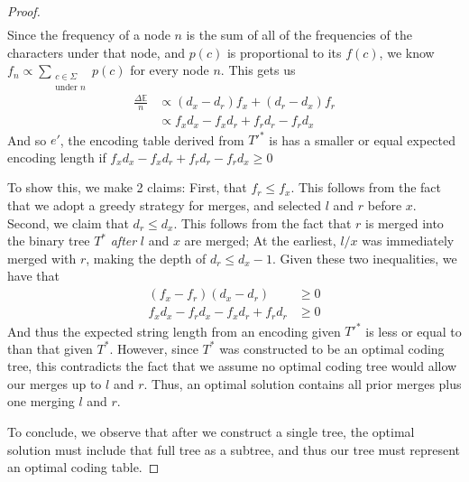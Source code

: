 \documentclass[10pt, twocolumn]{article}
\theoremstyle{prob}
\theoremstyle{definition}
\begin{document}
\begin{proof}
\begin{align*}
    \end{align*}
    Since the frequency of a node $n$ is the sum of all of the frequencies of the characters under that node, and $p(c)$ is proportional to its $f(c)$, we know $f_n \propto \sum_{\substack{c \in \Sigma \\ \text{under } n}} p(c) $ for every node $n$. This gets us
    \begin{align*}
        \frac{\Delta\mathbb{E}}{n} &\propto (d_x - d_r)f_x + (d_r - d_x)f_r \\
        &\propto f_xd_x - f_xd_r + f_rd_r - f_rd_x 
    \end{align*}
    And so $e'$, the encoding table derived from $T'^*$ is has a smaller or equal expected encoding length if $f_xd_x - f_xd_r + f_rd_r - f_rd_x \geq 0$

    To show this, we make 2 claims: First, that $f_r \leq f_x$. This follows from the fact that we adopt a greedy strategy for merges, and selected $l$ and $r$ before $x$. Second, we claim that $d_r \leq d_x$. This follows from the fact that $r$ is merged into the binary tree $T^*$ \textit{after} $l$ and $x$ are merged; At the earliest, $l/x$ was immediately merged with $r$, making the depth of $d_r \leq d_x - 1$. Given these two inequalities, we have that
    \begin{align*}
        (f_x - f_r)(d_x - d_r) &\geq 0 \\
        f_xd_x - f_rd_x - f_xd_r + f_rd_r &\geq 0 
    \end{align*}
    And thus the expected string length from an encoding given $T'^*$ is less or equal to than that given $T^*$. However, since $T^*$ was constructed to be an optimal coding tree, this contradicts the fact that we assume no optimal coding tree would allow our merges up to $l$ and $r$. Thus, an optimal solution contains all prior merges plus one merging $l$ and $r$.

    To conclude, we observe that after we construct a single tree, the optimal solution must include that full tree as a subtree, and thus our tree must represent an optimal coding table.
\end{proof}
\end{document}
